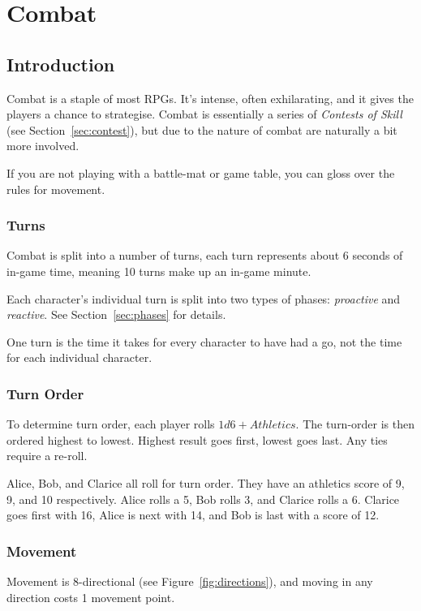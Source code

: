 \chapter{Combat}\label{chap:combat}
\section{Introduction}
Combat is a staple of most RPGs. 
It's intense, often exhilarating, and it gives the players a chance to strategise.
Combat is essentially a series of \textit{Contests of Skill} (see Section~\ref{sec:contest}), but due to the nature of combat are naturally a bit more involved.

\note If you are not playing with a battle-mat or game table, you can gloss over the rules for movement.

\subsection{Turns}
Combat is split into a number of turns, each turn represents about 6 seconds of in-game time, meaning 10 turns make up an in-game minute.

Each character's individual turn is split into two types of phases: \textit{proactive} and \textit{reactive}.
See Section~\ref{sec:phases} for details.

\note One turn is the time it takes for every character to have had a go, not the time for each individual character.

\subsection{Turn Order}
To determine turn order, each player rolls $1d6 + \mathit{Athletics}$. 
The turn-order is then ordered highest to lowest. 
Highest result goes first, lowest goes last. 
Any ties require a re-roll.

\example Alice, Bob, and Clarice all roll for turn order. 
They have an athletics score of 9, 9, and 10 respectively. 
Alice rolls a 5, Bob rolls 3, and Clarice rolls a 6. 
Clarice goes first with 16, Alice is next with 14, and Bob is last with a score of 12.

\subsection{Movement}\label{sec:movement}
Movement is 8-directional (see Figure~\ref{fig:directions}), and moving in any direction costs 1 movement point.


